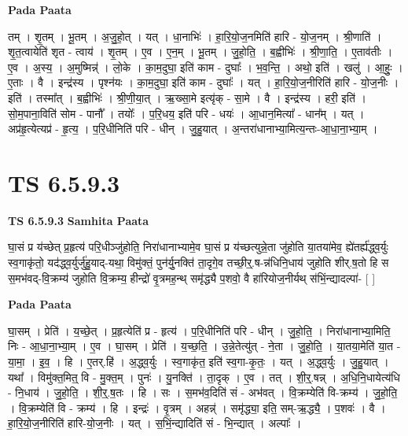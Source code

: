 \documentclass[17pt]{extarticle}
\begin{document}
\textbf{Pada Paata} \newline

तम् । शृ॒तम् । भू॒तम् । अ॒जु॒हो॒त् । यत् । धा॒नाभिः॑ । हा॒रि॒यो॒ज॒नमिति॑ हारि - यो॒ज॒नम् । श्री॒णाति॑ । शृ॒त॒त्वायेति॑ शृत - त्वाय॑ । शृ॒तम् । ए॒व । ए॒न॒म् । भू॒तम् । जु॒हो॒ति॒ । ब॒ह्वीभिः॑ । श्री॒णा॒ति॒ । ए॒ताव॑तीः । ए॒व । अ॒स्य॒ । अ॒मुष्मिन्न्॑ । लो॒के । का॒म॒दुघा॒ इति॑ काम - दुघाः᳚ । भ॒व॒न्ति॒ । अथो॒ इति॑ । खलु॑ । आ॒हुः॒ । ए॒ताः । वै । इन्द्र॑स्य । पृश्न॑यः । का॒म॒दुघा॒ इति॑ काम - दुघाः᳚ । यत् । हा॒रि॒यो॒ज॒नीरिति॑ हारि - यो॒ज॒नीः । इति॑ । तस्मा᳚त् । ब॒ह्वीभिः॑ । श्री॒णी॒या॒त् । ऋ॒ख्सा॒मे इत्यृ॑क् - सा॒मे । वै । इन्द्र॑स्य । हरी॒ इति॑ । सो॒म॒पाना॒विति॑ सोम - पानौ᳚ । तयोः᳚ । प॒रि॒धय॒ इति॑ परि - धयः॑ । आ॒धान॒मित्या᳚ - धान᳚म् । यत् । अप्र॑हृ॒त्येत्यप्र॑ - हृ॒त्य॒ । प॒रि॒धीनिति॑ परि - धीन् । जु॒हु॒यात् । अ॒न्तरा॑धानाभ्या॒मित्य॒न्तः-आ॒धा॒ना॒भ्या॒म् ।  \newline




\section*{ TS 6.5.9.3 }

\textbf{TS 6.5.9.3 } \newline
\textbf{Samhita Paata} \newline

घा॒सं प्र य॑च्छेत् प्र॒हृत्य॑ परि॒धीञ्जु॑होति॒ निरा॑धानाभ्यामे॒व घा॒सं प्र य॑च्छत्युन्ने॒ता जु॑होति या॒तया॑मेव॒ ह्ये॑तर्ह्य॑द्ध्व॒र्युः स्व॒गाकृ॑तो॒ यद॑द्ध्व॒र्युर्जु॑हु॒याद्-यथा॒ विमु॑क्तं॒ पुन॑र्यु॒नक्ति॑ ता॒दृगे॒व तच्छी॒र्॒.ष-न्न॑धिनि॒धाय॑ जुहोति शीर्.ष॒तो हि स स॒मभ॑वद्-वि॒क्रम्य॑ जुहोति वि॒क्रम्य॒ हीन्द्रो॑ वृ॒त्रमह॒न्थ् समृ॑द्ध्यै प॒शवो॒ वै हा॑रियोज॒नीर्यथ् स॑भिं॒न्द्यादल्पा॑- [  ] \newline

\textbf{Pada Paata} \newline

घा॒सम् । प्रेति॑ । य॒च्छे॒त् । प्र॒हृत्येति॑ प्र - हृत्य॑ । प॒रि॒धीनिति॑ परि - धीन् । जु॒हो॒ति॒ । निरा॑धानाभ्या॒मिति॒ निः - आ॒धा॒ना॒भ्या॒म् । ए॒व । घा॒सम् । प्रेति॑ । य॒च्छ॒ति॒ । उ॒न्ने॒तेत्यु॑त् - ने॒ता । जु॒हो॒ति॒ । या॒तया॒मेति॑ या॒त - या॒मा॒ । इ॒व॒ । हि । ए॒तर्.हि॑ । अ॒द्ध्व॒र्युः । स्व॒गाकृ॑त॒ इति॑ स्व॒गा-कृ॒तः॒ । यत् । अ॒द्ध्व॒र्युः । जु॒हु॒यात् । यथा᳚ । विमु॑क्त॒मित्॒ वि - मु॒क्त॒म् । पुनः॑ । यु॒नक्ति॑ । ता॒दृक् । ए॒व । तत् । शी॒र्॒.षन्न् । अ॒धि॒नि॒धायेत्य॑धि - नि॒धाय॑ । जु॒हो॒ति॒ । शी॒र्॒.ष॒तः । हि । सः । स॒मभ॑व॒दिति॑ सं - अभ॑वत् । वि॒क्रम्येति॑ वि-क्रम्य॑ । जु॒हो॒ति॒ । वि॒क्रम्येति॑ वि - क्रम्य॑ । हि । इन्द्रः॑ । वृ॒त्रम् । अहन्न्॑ । समृ॑द्ध्या॒ इति॒ सम्-ऋ॒द्ध्यै॒ । प॒शवः॑ । वै । हा॒रि॒यो॒ज॒नीरिति॑ हारि-यो॒ज॒नीः । यत् । स॒भिं॒न्द्यादिति॑ सं - भि॒न्द्यात् । अल्पाः᳚ ।  \newline
\end{document}
